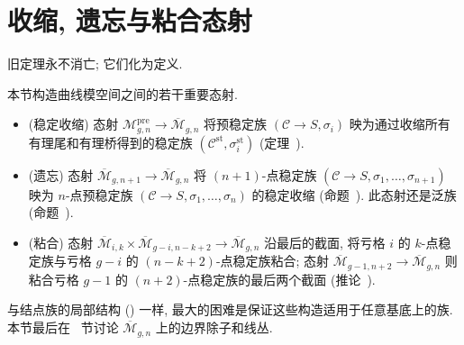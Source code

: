 \section{收缩, 遗忘与粘合态射}\label{src:6.6}
\begin{epigraph}
旧定理永不消亡; 它们化为定义.
\end{epigraph}
本节构造曲线模空间之间的若干重要态射.
\begin{itemize}
\item (稳定收缩) 态射 $\mathcal M_{g,\allowbreak n}^{\mathrm{pre}}\to\overline{\mathcal M}_{g,\allowbreak n}$ 将预稳定族 $(\mathcal C\to\allowbreak S,\allowbreak \sigma_i)$ 映为通过收缩所有有理尾和有理桥得到的稳定族 $(\mathcal C^{\mathrm{st}},\allowbreak \sigma_i^{\mathrm{st}})$ (定理~).
\item (遗忘) 态射 $\overline{\mathcal M}_{g,\allowbreak n+1}\to\overline{\mathcal M}_{g,\allowbreak n}$ 将 $(n+1)$-点稳定族 $(\mathcal C\to\allowbreak S,\allowbreak \sigma_1,\allowbreak \ldots,\allowbreak \sigma_{n+1})$ 映为 $n$-点预稳定族 $(\mathcal C\to\allowbreak S,\allowbreak \sigma_1,\allowbreak \ldots,\allowbreak \sigma_n)$ 的稳定收缩 (命题~). 此态射还是泛族 (命题~).
\item (粘合) 态射 $\overline{\mathcal M}_{i,\allowbreak k}\times\overline{\mathcal M}_{g-i,\allowbreak n-k+2}\to\overline{\mathcal M}_{g,\allowbreak n}$ 沿最后的截面, 将亏格 $i$ 的 $k$-点稳定族与亏格 $g-i$ 的 $(n-k+2)$-点稳定族粘合; 态射 $\overline{\mathcal M}_{g-1,\allowbreak n+2}\to\overline{\mathcal M}_{g,\allowbreak n}$ 则粘合亏格 $g-1$ 的 $(n+2)$-点稳定族的最后两个截面 (推论~).
\end{itemize}
与结点族的局部结构 () 一样, 最大的困难是保证这些构造适用于任意基底上的族. 本节最后在~ 节讨论 $\overline{\mathcal M}_{g,\allowbreak n}$ 上的边界除子和线丛.
